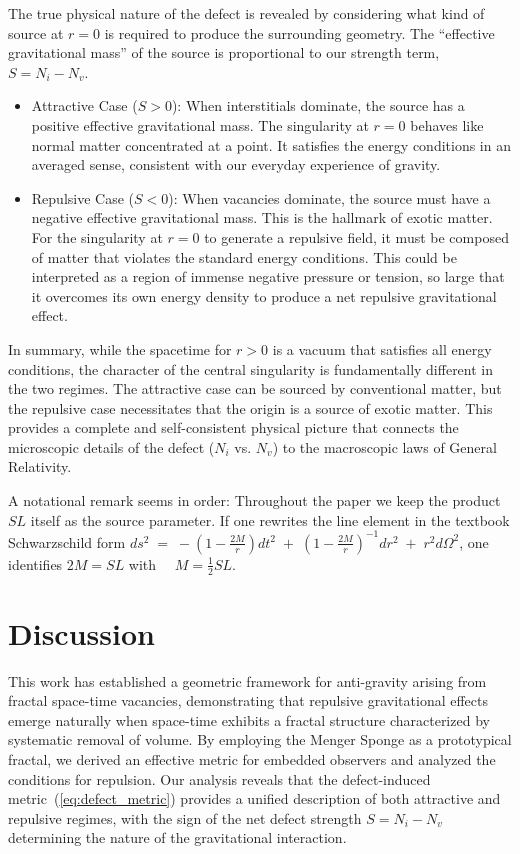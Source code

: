 \documentclass[%
  reprint,
  superscriptaddress,
  showpacs,
  showkeys,
  amsmath,amssymb,
  pra,
  longbibliography,
  floatfix,
]{revtex4-2}
\begin{document}
The true physical nature of the defect is revealed by considering what kind of source at $r=0$ is required to produce the surrounding geometry. The ``effective gravitational mass'' of the source is proportional to our strength term, $S = N_i - N_v$.

\begin{itemize}
    \item {Attractive Case ($S > 0$):}
    When interstitials dominate, the source has a positive effective gravitational mass. The singularity at $r=0$ behaves like normal matter concentrated at a point. It satisfies the energy conditions in an averaged sense, consistent with our everyday experience of gravity.

    \item {Repulsive Case ($S < 0$):}
    When vacancies dominate, the source must have a negative effective gravitational mass. This is the hallmark of  exotic matter. For the singularity at $r=0$ to generate a repulsive field, it must be composed of matter that violates the standard energy conditions. This could be interpreted as a region of immense negative pressure or tension, so large that it overcomes its own energy density to produce a net repulsive gravitational effect.
\end{itemize}

In summary, while the spacetime for $r>0$ is a vacuum that satisfies all energy conditions, the character of the central singularity is fundamentally different in the two regimes. The attractive case can be sourced by conventional matter, but the repulsive case necessitates that the origin is a source of exotic matter. This provides a complete and self-consistent physical picture that connects the microscopic details of the defect ($N_i$ vs. $N_v$) to the macroscopic laws of General Relativity.

A notational remark seems in order:
Throughout the paper we keep the product $SL$ itself as the source parameter.
If one rewrites the line element in the textbook Schwarzschild form
$ds^{2} \;=\;
- \left(1-\frac{2M}{r}\right) dt^{2}
\;+\;
\left(1-\frac{2M}{r}\right)^{-1} dr^{2}
\;+\;
r^{2} d\Omega^{2}$,
one identifies
$
2M = SL$ with $\quad M=\tfrac12 SL $.

\section{Discussion}
\label{sec:discuss}

This work has established a geometric framework for anti-gravity arising from fractal space-time vacancies,
demonstrating that repulsive gravitational effects emerge naturally when space-time exhibits a fractal structure characterized by systematic removal of volume. By employing the Menger Sponge as a prototypical fractal, we derived an effective metric for embedded observers and analyzed the conditions for repulsion. Our analysis reveals that the defect-induced metric~(\ref{eq:defect_metric}) provides a unified description of both attractive and repulsive regimes, with the sign of the net defect strength $S = N_i - N_v$ determining the nature of the gravitational interaction.
\end{document}
